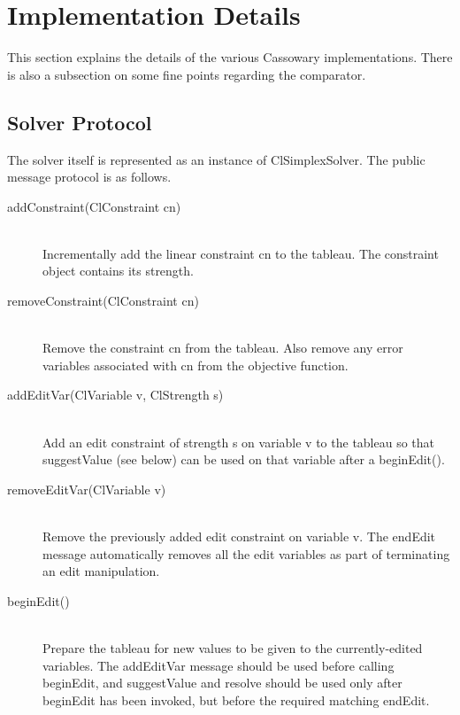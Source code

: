 \documentclass{article}
\begin{document}
\section{Implementation Details}
\label{cassowary-details}

This section explains the details of the various Cassowary
implementations. There is also a subsection on some fine points
regarding the comparator.

\subsection{Solver Protocol}
\label{solver-protocol}

The solver itself is represented as an instance of {\sf ClSimplexSolver}.
The public message protocol is as follows.

\begin{description}

\item[{\sf addConstraint(ClConstraint cn)}] \ \\
Incrementally add the linear constraint {\sf cn} to the tableau.  The
constraint object contains its strength.

\item[{\sf removeConstraint(ClConstraint cn)}] \ \\
Remove the constraint {\sf cn} from the tableau.  Also remove 
any error variables associated with {\sf cn} from the objective function.


\item[{\sf addEditVar(ClVariable v, ClStrength s)}] \ \\
      Add an edit constraint of strength {\sf s} on variable {\sf v} to
      the tableau so that {\sf suggestValue} (see below) can be used on
      that variable after a {\sf beginEdit()}.
      

\item[{\sf removeEditVar(ClVariable v)}] \ \\
      Remove the previously added edit constraint on variable {\sf v}.
      The {\sf endEdit} message automatically removes all the edit
      variables as part of terminating an edit manipulation.
      

\item[{\sf beginEdit()}] \ \\
      Prepare the tableau for new values to be given to the
      currently-edited variables.  The {\sf addEditVar} message should
      be used before calling {\sf beginEdit}, and {\sf suggestValue} and
      {\sf resolve} should be used only after {\sf beginEdit} has been
      invoked, but before the required matching {\sf endEdit}.
      


\end{description}
\end{document}

